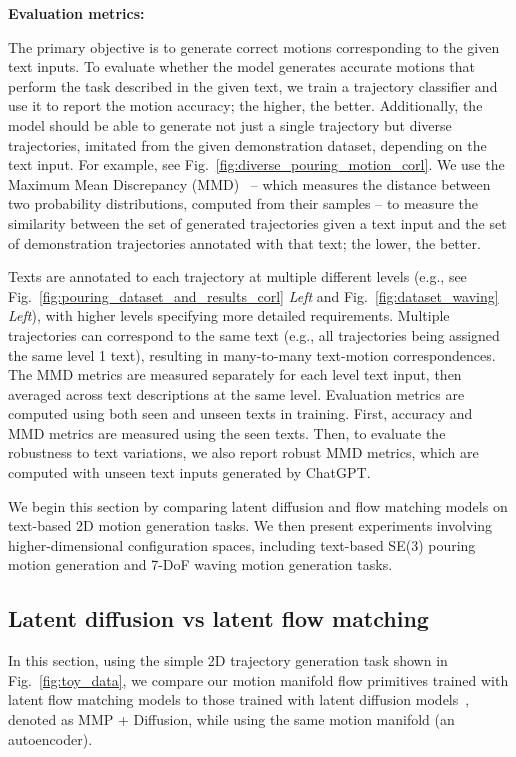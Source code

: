 \textbf{Evaluation metrics:} {The primary objective is to generate correct motions corresponding to the given text inputs. To evaluate whether the model generates accurate motions that perform the task described in the given text, we train a trajectory classifier and use it to report the motion accuracy; the higher, the better. 
Additionally, the model should be able to generate not just a single trajectory but diverse trajectories, imitated from the given demonstration dataset, depending on the text input. For example, see Fig.~\ref{fig:diverse_pouring_motion_corl}. 
We use the Maximum Mean Discrepancy (MMD)~\cite{gretton2012kernel} -- which measures the distance between two probability distributions, computed from their samples -- to measure the similarity between the set of generated trajectories given a text input and the set of demonstration trajectories annotated with that text; the lower, the better. 

Texts are annotated to each trajectory at multiple different levels (e.g., see Fig.~\ref{fig:pouring_dataset_and_results_corl} {\it Left} and Fig.~\ref{fig:dataset_waving} {\it Left}), with higher levels specifying more detailed requirements. Multiple trajectories can correspond to the same text (e.g., all trajectories being assigned the same level 1 text), resulting in many-to-many text-motion correspondences.
The MMD metrics are measured separately for each level text input, then averaged across text descriptions at the same level. 
Evaluation metrics are computed using both seen and unseen texts in training. First, accuracy and MMD metrics are measured using the seen texts. Then, to evaluate the robustness to text variations, we also report robust MMD metrics, which are computed with unseen text inputs generated by ChatGPT.

We begin this section by comparing latent diffusion and flow matching models on text-based 2D motion generation tasks. We then present experiments involving higher-dimensional configuration spaces, including text-based SE(3) pouring motion generation and 7-DoF waving motion generation tasks.

\subsection{Latent diffusion vs latent flow matching}
\label{sec:toy_exp}
In this section, using the simple 2D trajectory generation task shown in Fig.~\ref{fig:toy_data}, we compare our motion manifold flow primitives trained with latent flow matching models to those trained with latent diffusion models~\cite{song2020score}, denoted as MMP + Diffusion, while using the same motion manifold (an autoencoder). 

}
